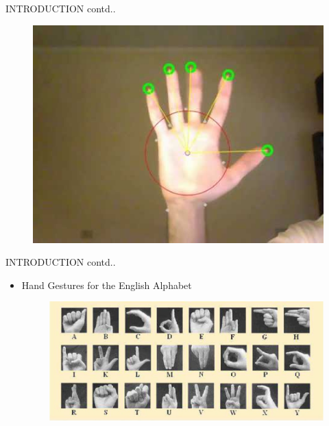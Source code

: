 \documentclass{beamer}
\begin{document}
\begin{frame}{INTRODUCTION contd..}
\begin{itemize}
\begin{figure}
\begin{center}
\includegraphics[scale=0.15]{images/plain.jpg}
\end{center}
\end{figure}
 


\end{itemize}
\end{frame}

\begin{frame}{INTRODUCTION contd..}
\begin{itemize}
\item Hand Gestures for the English Alphabet
\begin{figure}
\begin{center}
\includegraphics[scale=0.3]{images/alphabets.jpg}
\end{center}
\end{figure}
\vspace{.5 cm}

 


\end{itemize}
\end{frame}
\end{document}
